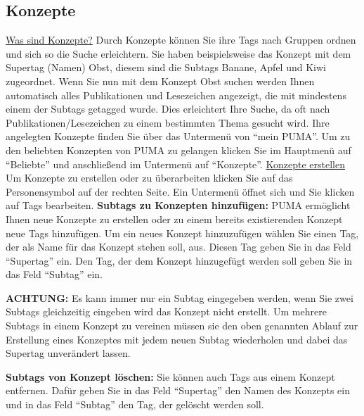 \subsection{Konzepte}
\underline{Was sind Konzepte?}
\newline
Durch Konzepte können Sie ihre Tags nach Gruppen ordnen und sich so die Suche erleichtern. Sie haben beispielsweise das Konzept mit dem Supertag (Namen) Obst, diesem sind die Subtags Banane, Apfel und Kiwi zugeordnet. Wenn Sie nun mit dem Konzept Obst suchen werden Ihnen automatisch alles Publikationen und Lesezeichen angezeigt, die mit mindestens einem der Subtags getagged wurde. Dies erleichtert Ihre Suche, da oft nach Publikationen/Lesezeichen zu einem bestimmten Thema gesucht wird. 
\newline Ihre angelegten Konzepte finden Sie über das Untermenü von \enquote{mein PUMA}. Um zu den beliebten Konzepten von PUMA zu gelangen klicken Sie im Hauptmenü auf \enquote{Beliebte} und anschließend im Untermenü auf \enquote{Konzepte}. 
\newline
\newline
\underline{Konzepte erstellen}
\newline
Um Konzepte zu erstellen oder zu überarbeiten klicken Sie auf das Personensymbol auf der rechten Seite. Ein Untermenü öffnet sich und Sie klicken auf Tags bearbeiten. 
\newline
\newline %
\textbf{Subtags zu Konzepten hinzufügen:} PUMA ermöglicht Ihnen neue Konzepte zu erstellen oder zu einem bereits existierenden Konzept neue Tags hinzufügen. Um ein neues Konzept hinzuzufügen wählen Sie einen Tag, der als Name für das Konzept stehen soll, aus. Diesen Tag geben Sie in das Feld \enquote{Supertag} ein. Den Tag, der dem Konzept hinzugefügt werden soll geben Sie in das Feld \enquote{Subtag} ein.
\begin{shaded} \centering\textbf{ACHTUNG:} Es kann immer nur ein Subtag eingegeben werden, wenn Sie zwei Subtags gleichzeitig eingeben wird das Konzept nicht erstellt. Um mehrere Subtags in einem Konzept zu vereinen müssen sie den oben genannten Ablauf zur Erstellung eines Konzeptes mit jedem neuen Subtag wiederholen und dabei das Supertag unverändert lassen. 
\end{shaded}
\textbf{Subtags von Konzept löschen:} Sie können auch Tags aus einem Konzept entfernen. Dafür geben Sie in das Feld \enquote{Supertag} den Namen des Konzepts ein und in das Feld \enquote{Subtag} den Tag, der gelöscht werden soll. 
